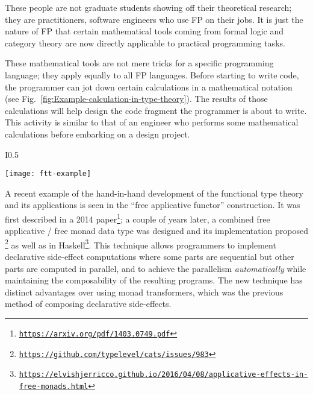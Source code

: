 These people are not graduate students showing off their theoretical
research; they are practitioners, software engineers who use FP on
their jobs. It is just the nature of FP that certain mathematical
tools \textemdash{} coming from formal logic and category theory \textemdash{}
are now directly applicable to practical programming tasks.

These mathematical tools are not mere tricks for a specific programming
language; they apply equally to all FP languages. Before starting
to write code, the programmer can jot down certain calculations in
a mathematical notation (see Fig.\ \ref{fig:Example-calculation-in-type-theory}).
The results of those calculations will help design the code fragment
the programmer is about to write. This activity is similar to that
of an engineer who performs some mathematical calculations before
embarking on a design project.\begin{wrapfigure}{I}{0.5\textwidth}%
\begin{centering}
{\footnotesize{}\vspace{-0.5\baselineskip}
\texttt{[image: ftt-example]}\vspace{-0.5\baselineskip}
}{\footnotesize\par}
\par\end{centering}
{\footnotesize{}\caption{A programmer performs a derivation before writing Haskell code.\label{fig:Example-calculation-in-type-theory}}
}{\footnotesize\par}

\vspace{-0.5\baselineskip}
\end{wrapfigure}%
A recent example of the hand-in-hand development of the functional
type theory and its applications is seen in the ``free applicative
functor'' construction. It was first described in a 2014 paper\footnote{\texttt{\href{https://arxiv.org/pdf/1403.0749.pdf}{https://arxiv.org/pdf/1403.0749.pdf}}};
a couple of years later, a combined free applicative / free monad
data type was designed and its implementation proposed \footnote{\texttt{\href{https://github.com/typelevel/cats/issues/983}{https://github.com/typelevel/cats/issues/983}}}
as well as in Haskell\footnote{\texttt{\href{https://elvishjerricco.github.io/2016/04/08/applicative-effects-in-free-monads.html}{https://elvishjerricco.github.io/2016/04/08/applicative-effects-in-free-monads.html}}}.
This technique allows programmers to implement declarative side-effect
computations where some parts are sequential but other parts are computed
in parallel, and to achieve the parallelism \emph{automatically} while
maintaining the composability of the resulting programs. The new technique
has distinct advantages over using monad transformers, which was the
previous method of composing declarative side-effects.

